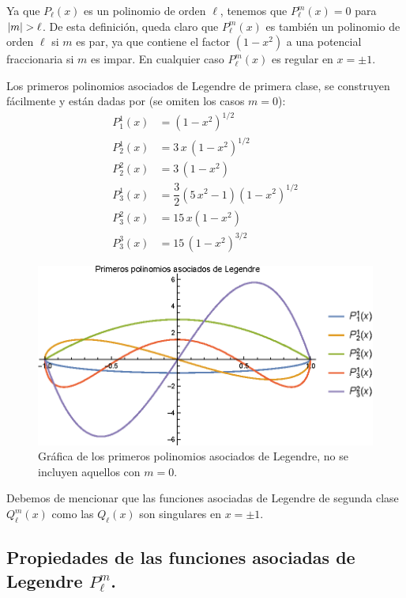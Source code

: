 Ya que $P_{\ell}(x)$ es un polinomio de orden $\ell$, tenemos que $P_{\ell}^{m}(x)=0$ para $\abs{m} > \ell$. De esta definición, queda claro que $P_{\ell}^{m} (x)$ es también un polinomio de orden $\ell$ si $m$ es par, ya que contiene el factor $(1-x^{2})$ a una potencial fraccionaria si $m$ es impar. En cualquier caso $P_{\ell}^{m}(x)$ es regular en $x = \pm 1$.
\par
Los primeros polinomios asociados de Legendre de primera clase, se construyen fácilmente y están dadas por (se omiten los casos $m=0$):
\begin{align*}
P_{1}^{1} (x) &= (1 - x^{2})^{1/2} \\[0.5em]
P_{2}^{1} (x) &= 3 \, x \, (1 - x^{2})^{1/2} \\[0.5em]
P_{2}^{2} (x) &= 3 \, (1 - x^{2}) \\[0.5em]
P_{3}^{1} (x) &= \dfrac{3}{2}(5 \, x^{2} - 1)(1 - x^{2})^{1/2} \\[0.5em]
P_{3}^{2} (x) &= 15 \, x (1 - x^{2}) \\[0.5em]
P_{3}^{3} (x) &= 15 \, (1 - x^{2})^{3/2}
\end{align*}

\begin{figure}[H]
    \centering
    \includegraphics[scale=1.3]{Imagenes/Plot_Asociados_Lagrange.eps}
    \caption{Gráfica de los primeros polinomios asociados de Legendre, no se incluyen aquellos con $m = 0$.}
    \label{fig:figura_asociados_Legedre}
\end{figure}

Debemos de mencionar que las funciones asociadas de Legendre de segunda clase $Q_{\ell}^{m} (x)$ como las $Q_{\ell}(x)$ son singulares en $x = \pm 1$.

\subsection{Propiedades de las funciones asociadas de Legendre \texorpdfstring{$P_{\ell}^{m}$}{Plm}.}

